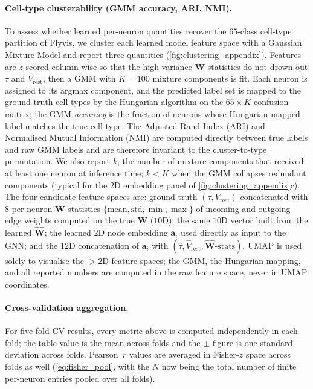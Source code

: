\documentclass{article}
\begin{document}
\paragraph{Cell-type clusterability (GMM accuracy, ARI, NMI).}
To assess whether learned per-neuron quantities recover the $65$-class
cell-type partition of Flyvis, we cluster each learned model feature space with a Gaussian Mixture Model and report three quantities
(\cref{fig:clustering_appendix}). Features are $z$-scored
column-wise so that the high-variance $\mathbf{W}$-statistics do not
drown out $\tau$ and $V_{\mathrm{rest}}$, then a GMM with $K=100$
mixture components is fit. Each neuron is assigned to its argmax
component, and the predicted label set is mapped to the ground-truth
cell types by the Hungarian algorithm on the $65 \times K$ confusion
matrix; the GMM \emph{accuracy} is the fraction of neurons whose
Hungarian-mapped label matches the true cell type. The Adjusted Rand
Index (ARI) and Normalised Mutual Information (NMI) are computed
directly between true labels and raw GMM labels and are therefore
invariant to the cluster-to-type permutation. We also report $k$, the
number of mixture components that received at least one neuron at
inference time; $k < K$ when the GMM collapses redundant components
(typical for the $2$D embedding panel of
\cref{fig:clustering_appendix}c). The four candidate feature spaces are: ground-truth $(\tau, V_{\mathrm{rest}})$ concatenated with $8$ per-neuron $\mathbf{W}$-statistics
$\{\mathrm{mean}, \mathrm{std}, \min, \max\}$ of incoming and outgoing
edge weights computed on the true $\mathbf{W}$ ($10$D); the same
$10$D vector built from the learned $\hat{\mathbf{W}}$; the
learned $2$D node embedding $\mathbf{a}_i$ used directly as input to
the GNN; and the $12$D concatenation of $\mathbf{a}_i$ with
$(\hat{\tau}, \hat{V}_{\mathrm{rest}},
\hat{\mathbf{W}}\text{-stats})$. UMAP is used solely to visualise
the $>2$D feature spaces; the GMM, the Hungarian mapping, and all
reported numbers are computed in the raw feature space, never in UMAP
coordinates.

\paragraph{Cross-validation aggregation.}
For five-fold CV results, every metric above is computed independently
in each fold; the table value is the mean across folds and the
$\pm$ figure is one standard deviation across folds. Pearson~$r$
values are averaged in Fisher-$z$ space across folds as well
(\cref{eq:fisher_pool}, with the $N$ now being the total number of
finite per-neuron entries pooled over all folds).
\end{document}
